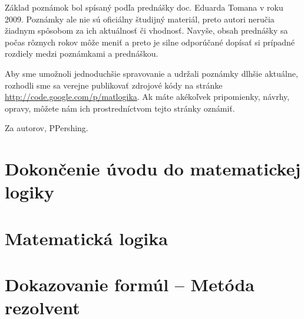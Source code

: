 \documentclass[a4paper]{report}
\begin{document}
Základ poznámok bol spísaný podľa prednášky doc. Eduarda Tomana v roku 2009.
Poznámky ale nie sú oficiálny študijný materiál, preto autori neručia
žiadnym spôsobom za ich aktuálnosť či vhodnosť. Navyše, obsah prednášky sa
počas rôznych rokov môže meniť a preto je silne odporúčané dopísať si
prípadné rozdiely medzi poznámkami a prednáškou.

Aby sme umožnoli jednoduchšie spravovanie a udržali poznámky dlhšie
aktuálne, rozhodli sme sa verejne publikovať zdrojové kódy na stránke
\url{http://code.google.com/p/matlogika}. Ak máte akékoľvek pripomienky,
návrhy, opravy, môžete nám ich prostredníctvom tejto stránky oznámiť.

Za autorov, PPershing.

\tableofcontents

\chapter{Dokončenie úvodu do matematickej logiky}





\chapter{Matematická logika}





\chapter{Dokazovanie formúl -- Metóda rezolvent}





\end{document}
